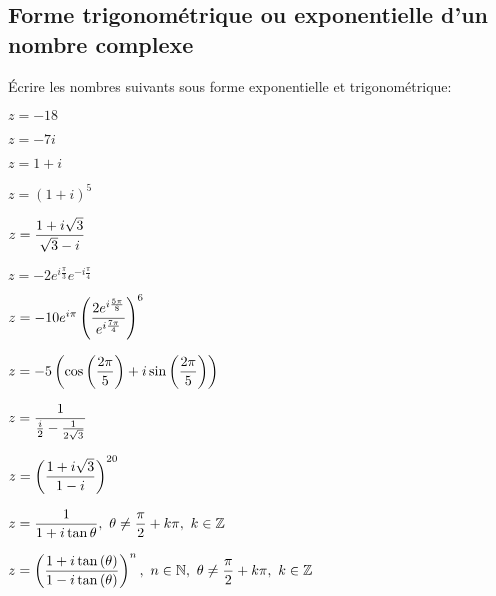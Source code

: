 \documentclass[a4paper, 11pt]{article}
\begin{document}
\subsection*{Forme trigonom\'etrique ou exponentielle d'un nombre complexe}
\vspace{0.2cm}

\begin{exercice}  \;
\'Ecrire les nombres suivants sous forme exponentielle et trigonom\'etrique:
\begin{enumerate}
\begin{minipage}[t]{0.45\textwidth}
\item $z=-18$
\item $z=-7i$
\item $z=1+i$
\item $z=(1+i)^5$ 
\item $z=\displaystyle\frac{1+i\sqrt{3}}{\sqrt{3}-i}$ 
\item $z=-2e^{i\frac{\pi}{3}}e^{-i\frac{\pi}{4}}$
\item $z=-10e^{i\pi}\left(\displaystyle\frac{2e^{i\frac{5\pi}{8}}}{e^{i\frac{7\pi}{4}}}\right)^6$
\end{minipage}
\begin{minipage}[t]{0.45\textwidth}
\item $z=-5\left(\cos{\left(\displaystyle\frac{2\pi}{5}\right)} +i\sin{\left(\displaystyle\frac{2\pi}{5}\right)}  \right)$
\item $z=\displaystyle\frac{1}{\frac{i}{2}-\frac{1}{2\sqrt{3}}}$
\item $z=\left( \displaystyle\frac{1+i\sqrt{3}}{1-i}  \right)^{20}$
\item $z=\ddp\frac{1}{1+i\tan{\theta}},\ \theta\not= \ddp\frac{\pi}{2}+k\pi,\ k\in\bZ$
\item $z=\left( \ddp\frac{1+i\tan{(\theta)}}{1-i\tan{(\theta)}}  \right)^n,\ n\in\bN,\ \theta\not= \ddp\frac{\pi}{2}+k\pi,\ k\in\bZ$
\end{minipage}
\end{enumerate}
\end{exercice}
\end{document}
